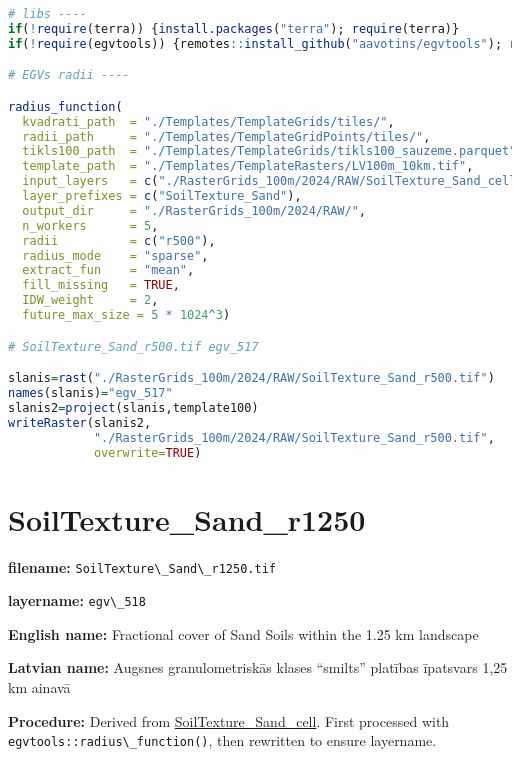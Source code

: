 \documentclass[
]{book}
\newcommand{\passthrough}[1]{#1}
\begin{document}
\begin{lstlisting}[language=R]
# libs ----
if(!require(terra)) {install.packages("terra"); require(terra)}
if(!require(egvtools)) {remotes::install_github("aavotins/egvtools"); require(egvtools)}

# EGVs radii ----

radius_function(
  kvadrati_path  = "./Templates/TemplateGrids/tiles/",
  radii_path     = "./Templates/TemplateGridPoints/tiles/",
  tikls100_path  = "./Templates/TemplateGrids/tikls100_sauzeme.parquet",
  template_path  = "./Templates/TemplateRasters/LV100m_10km.tif",
  input_layers   = c("./RasterGrids_100m/2024/RAW/SoilTexture_Sand_cell.tif"),
  layer_prefixes = c("SoilTexture_Sand"),
  output_dir     = "./RasterGrids_100m/2024/RAW/",
  n_workers      = 5,
  radii          = c("r500"),
  radius_mode    = "sparse",
  extract_fun    = "mean",
  fill_missing   = TRUE,
  IDW_weight     = 2,
  future_max_size = 5 * 1024^3)

# SoilTexture_Sand_r500.tif egv_517

slanis=rast("./RasterGrids_100m/2024/RAW/SoilTexture_Sand_r500.tif")
names(slanis)="egv_517"
slanis2=project(slanis,template100)
writeRaster(slanis2,
            "./RasterGrids_100m/2024/RAW/SoilTexture_Sand_r500.tif",
            overwrite=TRUE)
\end{lstlisting}

\section{SoilTexture\_Sand\_r1250}\label{ch06.518}

\textbf{filename:} \passthrough{\lstinline!SoilTexture\_Sand\_r1250.tif!}

\textbf{layername:} \passthrough{\lstinline!egv\_518!}

\textbf{English name:} Fractional cover of Sand Soils within the 1.25 km landscape

\textbf{Latvian name:} Augsnes granulometriskās klases ``smilts'' platības īpatsvars 1,25 km ainavā

\textbf{Procedure:} Derived from \hyperref[ch06.516]{SoilTexture\_Sand\_cell}. First processed
with \passthrough{\lstinline!egvtools::radius\_function()!}, then rewritten to ensure layername.
\end{document}
